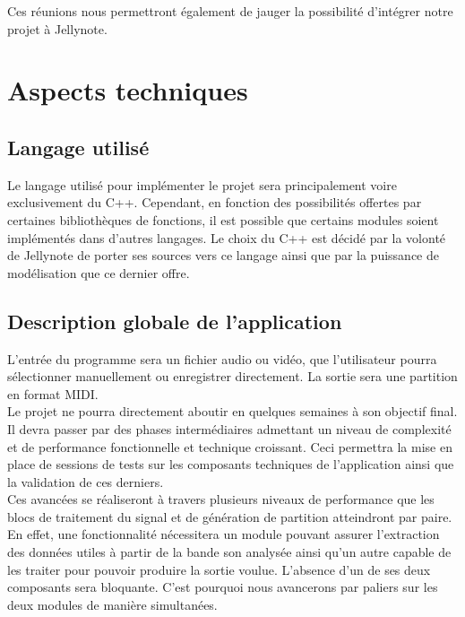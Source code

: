 \documentclass[12pt]{article}
\begin{document}
Ces réunions nous permettront également de jauger la possibilité d’intégrer notre projet à Jellynote.

\newpage
\section{Aspects techniques}
\subsection{Langage utilisé}

Le langage utilisé pour implémenter le projet sera principalement voire exclusivement du C++. Cependant, en fonction des possibilités offertes par certaines bibliothèques de fonctions, il est possible que certains modules soient implémentés dans d’autres langages. Le choix du C++ est décidé par la volonté de Jellynote de porter ses sources vers ce langage ainsi que par la puissance de modélisation que ce dernier offre.\\

\subsection{Description globale de l’application}

L’entrée du programme sera un fichier audio ou vidéo, que l’utilisateur pourra sélectionner manuellement ou enregistrer directement. La sortie sera une partition en format MIDI.\\

Le projet ne pourra directement aboutir en quelques semaines à son objectif final. Il devra passer par des phases intermédiaires admettant un niveau de complexité et de performance fonctionnelle et technique croissant. Ceci permettra la mise en place de sessions de tests sur les composants techniques de l’application ainsi que la validation de ces derniers.\\

Ces avancées se réaliseront à travers plusieurs niveaux de performance que les blocs de traitement du signal et de génération de partition atteindront par paire. En effet, une fonctionnalité nécessitera un module pouvant assurer l’extraction des données utiles à partir de la bande son analysée ainsi qu’un autre capable de les traiter pour pouvoir produire la sortie voulue. L’absence d’un de ses deux composants sera bloquante. C’est pourquoi nous avancerons par paliers sur les deux modules de manière simultanées. \\
\end{document}
